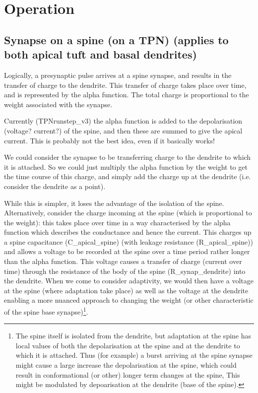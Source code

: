 \documentclass[11pt, oneside]{article}   	%
\begin{document}
\section{Operation}
 
 \subsection{Synapse on a spine (on a TPN) (applies to both apical tuft and basal dendrites)}
Logically, a presynaptic pulse arrives at a spine synapse, and results in the transfer of charge to the dendrite. This transfer of charge takes place over time, and  is represented by the alpha function. The  total charge is proportional to the weight associated with the synapse. 

Currently (TPNrunstep\_v3) the alpha function is added to the depolarisation (voltage? current?) of the spine, and then these are summed to give the apical current. This is probably not the best idea, even if it basically works!

We could consider the synapse to be transferring charge to the dendrite to which it is attached. So we could just multiply the alpha function by the weight to get the time course of this charge, and simply add the charge up at the dendrite (i.e. consider the dendrite as a point). 

While this is simpler, it loses the advantage of the isolation of the spine. Alternatively, consider the charge incoming at the spine (which is proportional to the weight): this takes place over time in a way characterised by the alpha function which describes the conductance and hence the current. This charges up a spine capacitance (C\_apical\_spine) (with leakage resistance (R\_apical\_spine)) and allows a voltage to be recorded at the spine over a time period rather longer than the alpha function. This voltage  causes a transfer of charge (current over time) through the resistance of the body of the spine (R\_synap\_dendrite) into the dendrite. When we come to consider adaptivity, we would then have a voltage at the spine (where adaptation take place) as well as the voltage at the dendrite enabling a more nuanced approach to changing the weight (or other characteristic of the spine base synapse)\footnote{The spine itself is isolated from the dendrite, but adaptation at the spine has local values of both the depolarisation at the spine and at the dendrite to which it is attached. Thus (for example) a burst arriving at the spine synapse might cause a large increase the depolarisation at the spine, which could result in conformational (or other) longer term changes at the spine, This might be modulated by depoarisation at the dendrite (base of the spine).}. 
\end{document}
